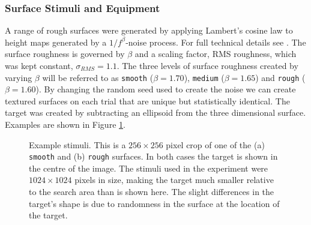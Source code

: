 \documentclass[man]{apa6}
\begin{document}
\subsubsection{Surface Stimuli and Equipment}
\label{sec:stimuli}
A range of rough surfaces were generated by applying Lambert's cosine law to height maps generated by a $1/f^{\beta}$-noise process. For full technical details see \textcite{clarke2008}. The surface roughness is governed by $\beta$ and a scaling factor, RMS roughness, which was kept constant, $\sigma_{RMS}=1.1$. The three levels of surface roughness created by varying $\beta$ will be referred to as \texttt{smooth} ($\beta=1.70$), \texttt{medium} ($\beta=1.65$) and \texttt{rough} ($\beta=1.60$).  By changing the random seed used to create the noise we can create textured surfaces on each trial that are unique but statistically identical. The target was created by subtracting an ellipsoid from the three dimensional surface. Examples are shown in Figure \ref{fig:exampleStimuli}. 

\begin{figure}[tb]
	\centering
	\caption{Example stimuli. This is a $256\times 256$ pixel crop of one of the (a) \texttt{smooth} and (b) \texttt{rough} surfaces. In both cases the target is shown in the centre of the image. The stimuli used in the experiment were $1024\times 1024$ pixels in size, making the target much smaller relative to the search area than is shown here. The slight differences in the target's shape is due to randomness in the surface at the location of the target.} 
	\label{fig:exampleStimuli}
\end{figure}
\end{document}
